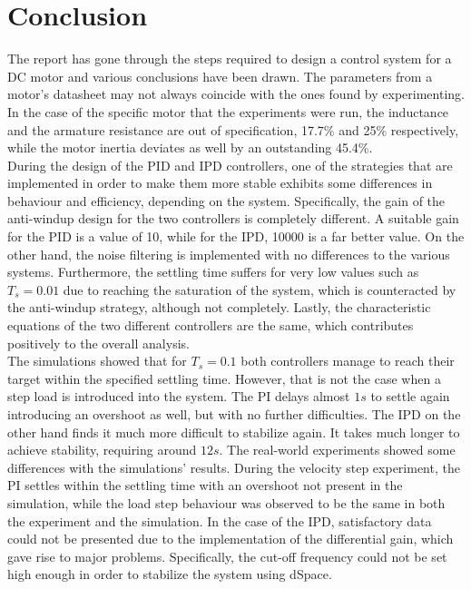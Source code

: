 \section{Conclusion}

The report has gone through the steps required to design a control system for a DC motor and various conclusions have been drawn. The parameters from a motor's datasheet may not always coincide with the ones found by experimenting. In the case of the specific motor that the experiments were run, the inductance and the armature resistance are out of specification, 17.7\% and 25\% respectively, while the motor inertia deviates as well by an outstanding 45.4\%. 
\\

During the design of the PID and IPD controllers, one of the strategies that are implemented in order to make them more stable exhibits some differences in behaviour and efficiency, depending on the system. Specifically, the gain of the anti-windup design for the two controllers is completely different. A suitable gain for the PID is a value of 10, while for the IPD, 10000 is a far better value. On the other hand, the noise filtering is implemented with no differences to the various systems. Furthermore, the settling time suffers for very low values such as $T_s=0.01$ due to reaching the saturation of the system, which is counteracted by the anti-windup strategy, although not completely. Lastly, the characteristic equations of the two different controllers are the same, which contributes positively to the overall analysis.
\\

The simulations showed that for $T_s=0.1$ both controllers manage to reach their target within the specified settling time. However, that is not the case when a step load is introduced into the system. The PI delays almost $1s$ to settle again introducing an overshoot as well, but with no further difficulties. The IPD on the other hand finds it much more difficult to stabilize again. It takes much longer to achieve stability, requiring around $12s$. The real-world experiments showed some differences with the simulations' results. During the velocity step experiment, the PI settles within the settling time with an overshoot not present in the simulation, while the load step behaviour was observed to be the same in both the experiment and the simulation. In the case of the IPD, satisfactory data could not be presented due to the implementation of the differential gain, which gave rise to major problems. Specifically, the cut-off frequency could not be set high enough in order to stabilize the system using dSpace.
